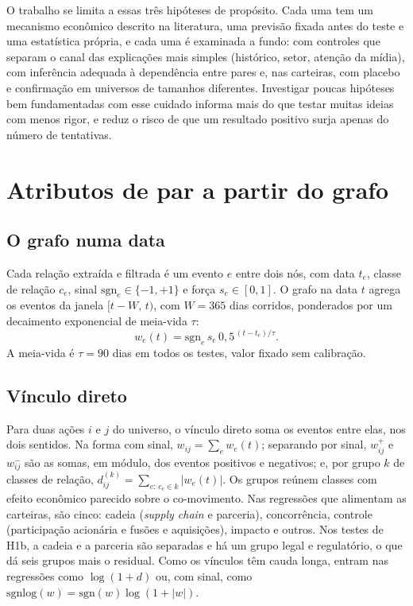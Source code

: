 O trabalho se limita a essas três hipóteses de propósito. Cada uma tem um mecanismo econômico descrito na
literatura, uma previsão fixada antes do teste e uma estatística própria, e cada uma é examinada a fundo:
com controles que separam o canal das explicações mais simples (histórico, setor, atenção da mídia), com
inferência adequada à dependência entre pares e, nas carteiras, com placebo e confirmação em universos de
tamanhos diferentes. Investigar poucas hipóteses bem fundamentadas
com esse cuidado informa mais do que testar muitas ideias com menos rigor, e reduz o risco de que um
resultado positivo surja apenas do número de tentativas.

\section{Atributos de par a partir do grafo}
\label{sec:atributos}

\subsection{O grafo numa data}

Cada relação extraída e filtrada é um evento $e$ entre dois nós, com data $t_e$, classe de relação
$c_e$, sinal $\mathrm{sgn}_e\in\{-1,+1\}$ e força $s_e\in[0,1]$. O grafo na data $t$ agrega os eventos
da janela $[t-W,\,t)$, com $W=365$ dias corridos, ponderados por um decaimento exponencial de meia-vida
$\tau$:
\begin{equation}
  w_e(t) = \mathrm{sgn}_e\, s_e\, 0{,}5^{\,(t-t_e)/\tau}.
  \label{eq:peso-evento}
\end{equation}
A meia-vida é $\tau=90$ dias em todos os testes, valor fixado sem calibração.

\subsection{Vínculo direto}

Para duas ações $i$ e $j$ do universo, o vínculo direto soma os eventos entre elas, nos dois sentidos.
Na forma com sinal, $w_{ij}=\sum_e w_e(t)$; separando por sinal, $w^+_{ij}$ e $w^-_{ij}$ são as somas,
em módulo, dos eventos positivos e negativos; e, por grupo $k$ de classes de relação,
$d^{(k)}_{ij}=\sum_{e:\,c_e\in k}|w_e(t)|$. Os grupos reúnem classes com efeito econômico parecido sobre
o co-movimento. Nas regressões que alimentam as carteiras, são cinco: cadeia (\emph{supply chain} e
parceria), concorrência, controle (participação acionária e fusões e aquisições), impacto e outros. Nos
testes de H1b, a cadeia e a parceria são separadas e há um grupo legal e regulatório, o que dá seis
grupos mais o residual. Como os vínculos têm cauda longa, entram nas regressões como $\log(1+d)$ ou, com
sinal, como $\mathrm{sgnlog}(w)=\mathrm{sgn}(w)\log(1+|w|)$.

